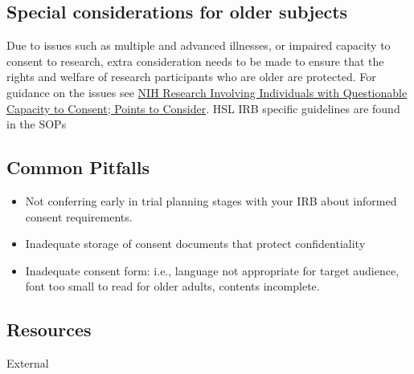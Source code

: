 \documentclass[]{book}
\begin{document}
\subsection{Special considerations for older
subjects}\label{special-considerations-for-older-subjects-5}

Due to issues such as multiple and advanced illnesses, or impaired
capacity to consent to research, extra consideration needs to be made to
ensure that the rights and welfare of research participants who are
older are protected. For guidance on the issues see
\href{http://grants.nih.gov/grants/policy/questionablecapacity.htm}{NIH
Research Involving Individuals with Questionable Capacity to Consent;
Points to Consider}. HSL IRB specific guidelines are found in the SOPs

\subsection{Common Pitfalls}\label{common-pitfalls-8}

\begin{itemize}
\item
  Not conferring early in trial planning stages with your IRB about
  informed consent requirements.
\item
  Inadequate storage of consent documents that protect confidentiality
\item
  Inadequate consent form: i.e., language not appropriate for target
  audience, font too small to read for older adults, contents
  incomplete.
\end{itemize}

\subsection{Resources}\label{resources-9}

External
\end{document}
